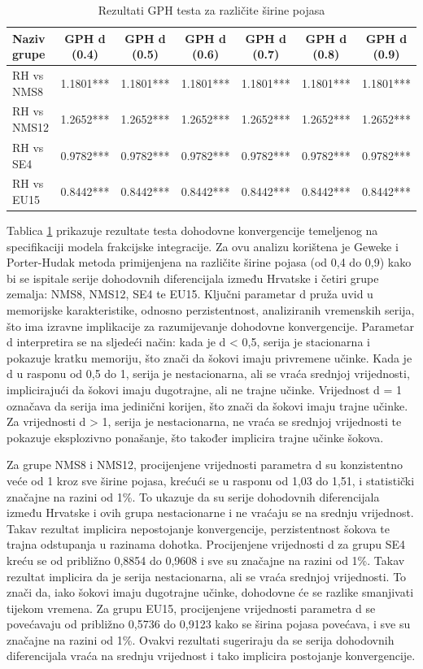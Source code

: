 \documentclass{crebsshr}
\begin{document}
\begin{table}[ht]
\centering
\caption{Rezultati GPH testa za različite širine pojasa}
\label{tab:tablica4}
\begin{tabular}{lcccccc}
\toprule
\textbf{Naziv grupe} & \textbf{GPH d (0.4)} & \textbf{GPH d (0.5)} & \textbf{GPH d (0.6)} & \textbf{GPH d (0.7)} & \textbf{GPH d (0.8)} & \textbf{GPH d (0.9)} \\
\midrule
RH vs NMS8   & 1.1801*** & 1.1801*** & 1.1801*** & 1.1801*** & 1.1801*** & 1.1801*** \\
RH vs NMS12  & 1.2652*** & 1.2652*** & 1.2652*** & 1.2652*** & 1.2652*** & 1.2652*** \\
RH vs SE4    & 0.9782*** & 0.9782*** & 0.9782*** & 0.9782*** & 0.9782*** & 0.9782*** \\
RH vs EU15    & 0.8442*** & 0.8442*** & 0.8442*** & 0.8442*** & 0.8442*** & 0.8442*** \\
\bottomrule
\end{tabular}
\end{table}

Tablica \ref{tab:tablica4} prikazuje rezultate testa dohodovne konvergencije temeljenog na specifikaciji modela frakcijske integracije. Za ovu analizu korištena je Geweke i Porter-Hudak metoda primijenjena na različite širine pojasa (od 0,4 do 0,9) kako bi se ispitale serije dohodovnih diferencijala između Hrvatske i četiri grupe zemalja: NMS8, NMS12, SE4 te EU15. Ključni parametar d pruža uvid u memorijske karakteristike, odnosno perzistentnost, analiziranih vremenskih serija, što ima izravne implikacije za razumijevanje dohodovne konvergencije. Parametar d interpretira se na sljedeći način: kada je d < 0,5, serija je stacionarna i pokazuje kratku memoriju, što znači da šokovi imaju privremene učinke. Kada je d u rasponu od 0,5 do 1, serija je nestacionarna, ali se vraća srednjoj vrijednosti, implicirajući da šokovi imaju dugotrajne, ali ne trajne učinke. Vrijednost d = 1 označava da serija ima jedinični korijen, što znači da šokovi imaju trajne učinke. Za vrijednosti d > 1, serija je nestacionarna, ne vraća se srednjoj vrijednosti te pokazuje eksplozivno ponašanje, što također implicira trajne učinke šokova.
    
    Za grupe NMS8 i NMS12, procijenjene vrijednosti parametra d su konzistentno veće od 1 kroz sve širine pojasa, krećući se u rasponu od 1,03 do 1,51, i statistički značajne na razini od 1\%. To ukazuje da su serije dohodovnih diferencijala između Hrvatske i ovih grupa nestacionarne i ne vraćaju se na srednju vrijednost. Takav rezultat implicira nepostojanje konvergencije, perzistentnost šokova te trajna odstupanja u razinama dohotka. Procijenjene vrijednosti d za grupu SE4 kreću se od približno 0,8854 do 0,9608 i sve su značajne na razini od 1\%. Takav rezultat implicira da je serija nestacionarna, ali se vraća srednjoj vrijednosti. To znači da, iako šokovi imaju dugotrajne učinke, dohodovne će se razlike smanjivati tijekom vremena. Za grupu EU15, procijenjene vrijednosti parametra d se povećavaju od približno 0,5736 do 0,9123 kako se širina pojasa povećava, i sve su značajne na razini od 1\%. Ovakvi rezultati sugeriraju da se serija dohodovnih diferencijala vraća na srednju vrijednost i tako implicira postojanje konvergencije.
    
\end{document}
